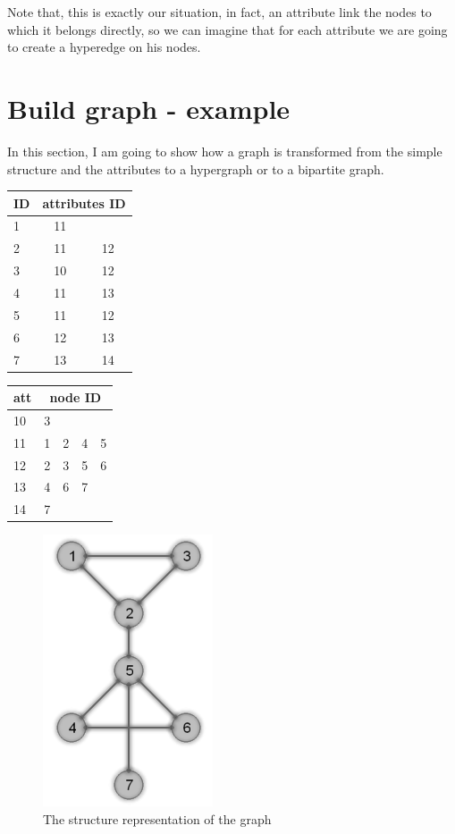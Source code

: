 \documentclass[epsfig,a4paper,11pt,titlepage,twoside,openany]{book}
\begin{document}
Note that, this is exactly our situation, in fact, an attribute link the nodes to which it belongs directly, so we can imagine that for each attribute we are going to create a hyperedge on his nodes.
%
%

\section{Build graph - example}
In this section, I am going to show how a graph is transformed from the simple structure and the attributes to a hypergraph or to a bipartite graph.\\
%
\begin{multicols}{2}
	\begin{center}
		\begin{tabular}{|l|cc|}
		\hline
		ID&\multicolumn{2}{c|}{attributes ID}\\
		\hline
		1&11&\\
		2&11&12\\
		3&10&12\\
		4&11&13\\
		5&11&12\\
		6&12&13\\
		7&13&14\\
		\hline
		\end{tabular}
		\label{tab:7_ID_to_att}
		\begin{tabular}{|l|cccc|}
		\hline
		att&\multicolumn{4}{c|}{node ID}\\
		\hline
		10&3&&&\\
		11&1&2&4&5\\
		12&2&3&5&6\\
		13&4&6&7&\\
		14&7&&&\\
		\hline
		\end{tabular}
		\label{tab:7_att_to_ID}
	\end{center}
\end{multicols}
%
%
\begin{figure}[htp]
	\centering
	\includegraphics{images/7transform_str}
	\caption{The structure representation of the graph}
	\label{fig:7transform_str}
\end{figure}
\end{document}
